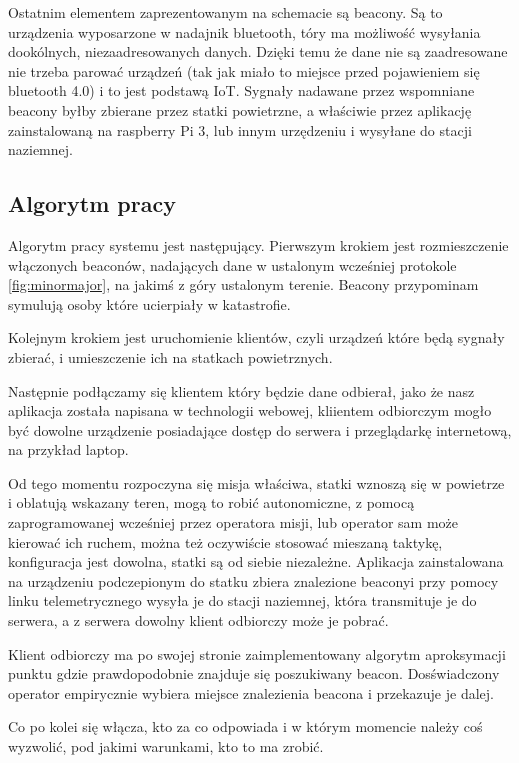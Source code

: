 Ostatnim elementem zaprezentowanym na schemacie są beacony. Są to urządzenia wyposarzone w nadajnik bluetooth, tóry ma możliwość wysyłania dookólnych, niezaadresowanych danych. Dzięki temu że dane nie są zaadresowane nie trzeba parować urządzeń (tak jak miało to miejsce przed pojawieniem się bluetooth 4.0) i to jest podstawą IoT. Sygnały nadawane przez wspomniane beacony byłby zbierane przez statki powietrzne, a właściwie przez aplikację zainstalowaną na raspberry Pi 3, lub innym urzędzeniu i wysyłane do stacji naziemnej.

\subsection{Algorytm pracy}

Algorytm pracy systemu jest następujący. Pierwszym krokiem jest rozmieszczenie włączonych beaconów, nadających dane w ustalonym wcześniej protokole \ref{fig:minormajor}, na jakimś z góry ustalonym terenie. Beacony przypominam symulują osoby które ucierpiały w katastrofie.

Kolejnym krokiem jest uruchomienie klientów, czyli urządzeń które będą sygnały zbierać, i umieszczenie ich na statkach powietrznych.

Następnie podłączamy się klientem który będzie dane odbierał, jako że nasz aplikacja została napisana w technologii webowej, kliientem odbiorczym mogło być dowolne urządzenie posiadające dostęp do serwera i przeglądarkę internetową, na przykład laptop.

Od tego momentu rozpoczyna się misja właściwa, statki wznoszą się w powietrze i oblatują wskazany teren, mogą to robić autonomiczne, z pomocą zaprogramowanej wcześniej przez operatora misji, lub operator sam może kierować ich ruchem, można też oczywiście stosować mieszaną taktykę, konfiguracja jest dowolna, statki są od siebie niezależne. Aplikacja zainstalowana na urządzeniu podczepionym do statku zbiera znalezione beaconyi przy pomocy linku telemetrycznego wysyła je do stacji naziemnej, która transmituje je do serwera, a z serwera dowolny klient odbiorczy może je pobrać.

Klient odbiorczy ma po swojej stronie zaimplementowany algorytm aproksymacji punktu gdzie prawdopodobnie znajduje się poszukiwany beacon. Dosświadczony operator empirycznie wybiera miejsce znalezienia beacona i przekazuje je dalej.

Co po kolei się włącza, kto za co odpowiada i w którym momencie należy coś wyzwolić, pod jakimi warunkami, kto to ma zrobić.
